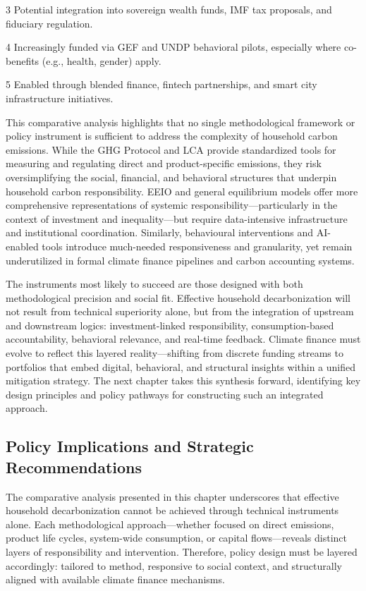 \documentclass[12pt,a4paper]{article}%
\begin{document}
\begin{table}[htbp]
\begin{threeparttable}
\begin{tablenotes}
\item[3] Potential integration into sovereign wealth funds, IMF tax proposals, and fiduciary regulation.
\item[4] Increasingly funded via GEF and UNDP behavioral pilots, especially where co-benefits (e.g., health, gender) apply.
\item[5] Enabled through blended finance, fintech partnerships, and smart city infrastructure initiatives.
\end{tablenotes}
\end{threeparttable}
\end{table}

This comparative analysis highlights that no single methodological framework or policy instrument is sufficient to address the complexity of household carbon emissions. While the GHG Protocol and LCA provide standardized tools for measuring and regulating direct and product-specific emissions, they risk oversimplifying the social, financial, and behavioral structures that underpin household carbon responsibility. EEIO and general equilibrium models offer more comprehensive representations of systemic responsibility—particularly in the context of investment and inequality—but require data-intensive infrastructure and institutional coordination. Similarly, behavioural interventions and AI-enabled tools introduce much-needed responsiveness and granularity, yet remain underutilized in formal climate finance pipelines and carbon accounting systems.

The instruments most likely to succeed are those designed with both methodological precision and social fit. Effective household decarbonization will not result from technical superiority alone, but from the integration of upstream and downstream logics: investment-linked responsibility, consumption-based accountability, behavioral relevance, and real-time feedback. Climate finance must evolve to reflect this layered reality—shifting from discrete funding streams to portfolios that embed digital, behavioral, and structural insights within a unified mitigation strategy. The next chapter takes this synthesis forward, identifying key design principles and policy pathways for constructing such an integrated approach.

\subsection{Policy Implications and Strategic Recommendations}

The comparative analysis presented in this chapter underscores that effective household decarbonization cannot be achieved through technical instruments alone. Each methodological approach—whether focused on direct emissions, product life cycles, system-wide consumption, or capital flows—reveals distinct layers of responsibility and intervention. Therefore, policy design must be layered accordingly: tailored to method, responsive to social context, and structurally aligned with available climate finance mechanisms.
\end{document}
